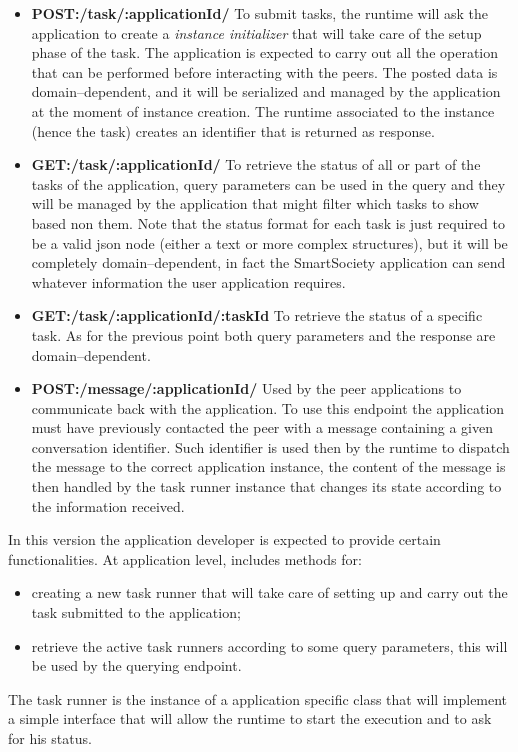 \begin{itemize}
\item {\bf POST:/task/:applicationId/} To submit tasks, the runtime will ask the application to create a \textit{instance initializer} that will take care of the setup phase of the task. The application is expected to carry out all the operation that can be performed before interacting with the peers. The posted data is domain--dependent, and it will be serialized and managed by the application at the moment of instance creation. The runtime associated to the instance (hence the task) creates an identifier that is returned as response.

\item {\bf GET:/task/:applicationId/} To retrieve the status of all or part of the tasks of the application, query parameters can be used in the query and they will be managed by the application that might filter which tasks to show based non them. Note that the status format for each task is just required to be a valid json node (either a text or more complex structures), but it will be completely domain--dependent, in fact the SmartSociety application can send whatever information the user application requires.

\item {\bf GET:/task/:applicationId/:taskId} To retrieve the status of a specific task. As for the previous point both query parameters and the response are domain--dependent.

\item {\bf POST:/message/:applicationId/} Used by the peer applications to communicate back with the application. To use this endpoint the application must have previously contacted the peer with a message containing a given conversation identifier. Such identifier is used then by the runtime to dispatch the message to the correct application instance, the content of the message is then handled by the task runner instance that changes its state according to the information received.

\end{itemize}

In this version the application developer is expected to provide certain functionalities. At application level, includes methods for:
\begin{itemize}
 	\item creating a new task runner that will take care of setting up and carry out the task submitted to the application;
 	\item retrieve the active task runners according to some query parameters, this will be used by the querying endpoint.
\end{itemize}
The task runner is the instance of a application specific class that will implement a simple interface that will allow the runtime 
to start the execution and to ask for his status.


